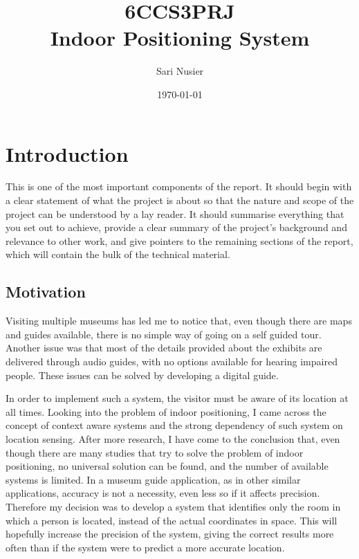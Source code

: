 \documentclass[12pt]{informatics-report}
\title{6CCS3PRJ\\\vspace{0.2cm}Indoor Positioning System}
\author{Sari Nusier}
\date{\today}
\begin{document}
\createFrontMatter
\onehalfspacing
\tableofcontents
\doublespacing


\chapter{Introduction}
This is one of the most important components of the report. It should begin with a clear statement of what the project is about so that the nature and scope of the project can be understood by a lay reader. It should summarise everything that you set out to achieve, provide a clear summary of the project's background and relevance to other work, and give pointers to the remaining sections of the report, which will contain the bulk of the technical material.

\section{Motivation}
Visiting multiple museums has led me to notice that, even though there are maps and guides available, there is no simple way of going on a self guided tour. Another issue was that most of the details provided about the exhibits are delivered through audio guides, with no options available for hearing impaired people. These issues can be solved by developing a digital guide.

In order to implement such a system, the visitor must be aware of its location at all times. Looking into the problem of indoor positioning, I came across the concept of context aware systems and the strong dependency of such system on location sensing. After more research, I have come to the conclusion that, even though there are many studies that try to solve the problem of indoor positioning, no universal solution can be found, and the number of available systems is limited. In a museum guide application, as in other similar applications, accuracy is not a necessity, even less so if it affects precision. Therefore my decision was to develop a system that identifies only the room in which a person is located, instead of the actual coordinates in space. This will hopefully increase the precision of the system, giving the correct results more often than if the system were to predict a more accurate location.
\end{document}
